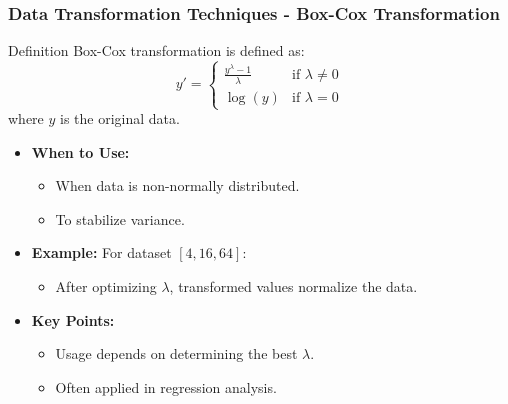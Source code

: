 \documentclass[aspectratio=169]{beamer}
\begin{document}
\begin{frame}[fragile]
    \frametitle{Data Transformation Techniques - Box-Cox Transformation}
    \begin{block}{Definition}
        Box-Cox transformation is defined as:
        \[
        y' = \begin{cases} 
        \frac{y^\lambda - 1}{\lambda} & \text{if } \lambda \neq 0 \\ 
        \log(y) & \text{if } \lambda = 0 
        \end{cases}
        \]
        where \( y \) is the original data.
    \end{block}
    
    \begin{itemize}
        \item \textbf{When to Use:}
        \begin{itemize}
            \item When data is non-normally distributed.
            \item To stabilize variance.
        \end{itemize}
        
        \item \textbf{Example:} For dataset \( [4, 16, 64] \):
        \begin{itemize}
            \item After optimizing \( \lambda \), transformed values normalize the data.
        \end{itemize}
        
        \item \textbf{Key Points:}
        \begin{itemize}
            \item Usage depends on determining the best \( \lambda \).
            \item Often applied in regression analysis.
        \end{itemize}
    \end{itemize}
\end{frame}
\end{document}
